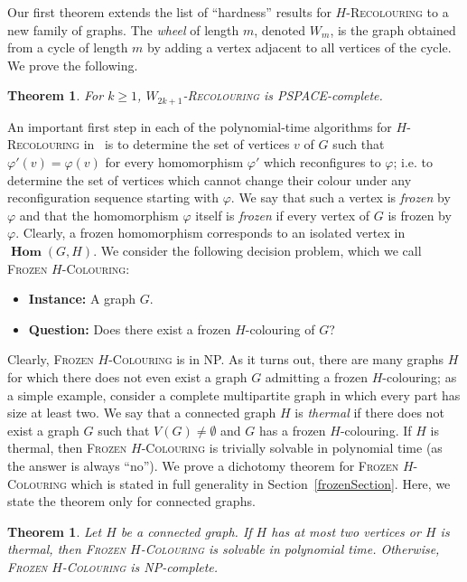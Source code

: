 \documentclass[11 pt]{amsart}
\newtheorem{thm}[equation]{Theorem}
\theoremstyle{definition}
\theoremstyle{case}
\numberwithin{equation}{section}
\newcommand\Hfrz[1]{\textsc{Frozen $#1$-Colouring}}
\newcommand\Hrec[1]{\textsc{$#1$-Recolouring}}
\newcommand{\bHom}{\operatorname{\mathbf{Hom}}}
\begin{document}
Our first theorem extends the list of ``hardness'' results for \Hrec{H} to a new family of graphs. The \emph{wheel} of length $m$, denoted $W_m$, is the graph obtained from a cycle of length $m$  by adding a vertex adjacent to all vertices of the cycle. We prove the following.

\begin{thm}
\label{wheelThm}
For $k\geq1$, \Hrec{W_{2k+1}} is PSPACE-complete.
\end{thm}

An important first step in each of the polynomial-time algorithms for \Hrec{H} in~\cite{3colReconfig,Wrochna,circularReconfig} is to determine the set of vertices $v$ of $G$ such that $\varphi'(v)=\varphi(v)$ for every homomorphism $\varphi'$ which reconfigures to $\varphi$; i.e. to determine the set of vertices which cannot change their colour under any reconfiguration sequence starting with $\varphi$. We say that such a vertex is \emph{frozen} by $\varphi$ and that the homomorphism $\varphi$ itself is \emph{frozen} if every vertex of $G$ is frozen by $\varphi$. Clearly, a frozen homomorphism corresponds to an isolated vertex in $\bHom(G,H)$. We consider the following decision problem, which we call \Hfrz{H}:
\begin{itemize}
\item[] \textbf{Instance:} A graph $G$.
\item[] \textbf{Question:} Does there exist a frozen $H$-colouring of $G$?
\end{itemize}
Clearly, \Hfrz{H} is in NP. As it turns out, there are many graphs $H$ for which there does not even exist a graph $G$ admitting a frozen $H$-colouring; as a simple example, consider a complete multipartite graph in which every part has size at least two. We say that a connected graph $H$ is \emph{thermal} if there does not exist a graph $G$ such that $V(G)\neq \emptyset$ and $G$ has a frozen $H$-colouring. If $H$ is thermal, then \Hfrz{H} is trivially solvable in polynomial time (as the answer is always ``no''). We prove a dichotomy theorem for \Hfrz{H} which is stated in full generality in Section~\ref{frozenSection}. Here, we state the theorem only for connected graphs.  


\begin{thm}
\label{frozenThmConn}
Let $H$ be a connected graph. If $H$ has at most two vertices or $H$ is thermal, then \Hfrz{H} is solvable in polynomial time. Otherwise, \Hfrz{H} is NP-complete. 
\end{thm}
\end{document}
